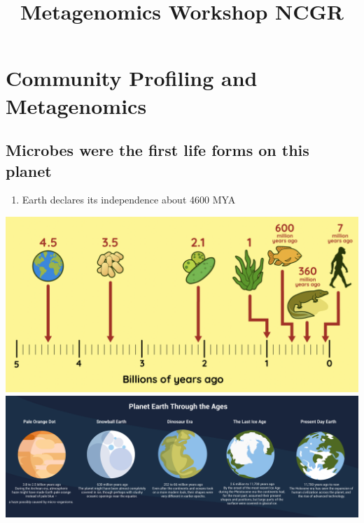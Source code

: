 \documentclass[
]{book}
\title{Metagenomics Workshop NCGR}
\author{}
\date{\vspace{-2.5em}}
\providecommand{\tightlist}{%
  \setlength{\itemsep}{0pt}\setlength{\parskip}{0pt}}
\begin{document}
\maketitle

{
\setcounter{tocdepth}{1}
\tableofcontents
}
\hypertarget{community-profiling-and-metagenomics}{%
\chapter{Community Profiling and Metagenomics}\label{community-profiling-and-metagenomics}}

\hypertarget{microbes-were-the-first-life-forms-on-this-planet}{%
\section{Microbes were the first life forms on this planet}\label{microbes-were-the-first-life-forms-on-this-planet}}

\begin{enumerate}
\def\labelenumi{\arabic{enumi}.}
\tightlist
\item
  Earth declares its independence about 4600 MYA
\end{enumerate}

\includegraphics[width=1\textwidth,height=\textheight]{./Figures/4billionyrs.png}
\includegraphics[width=1\textwidth,height=\textheight]{./Figures/Planets.png}
\end{document}
